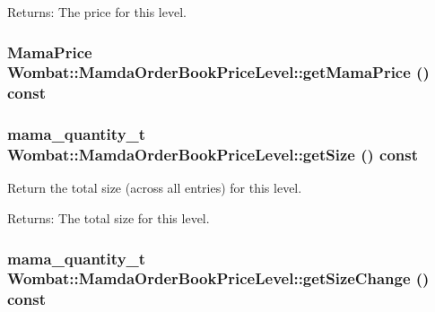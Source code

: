 \begin{Desc}
\item[Returns:]The price for this level. \end{Desc}
\hypertarget{classWombat_1_1MamdaOrderBookPriceLevel_f51f579cc10c5b537c4b9e07c9467ca0}{
\subsubsection[getMamaPrice]{\setlength{\rightskip}{0pt plus 5cm}Mama\-Price Wombat::Mamda\-Order\-Book\-Price\-Level::get\-Mama\-Price () const}}
\label{classWombat_1_1MamdaOrderBookPriceLevel_f51f579cc10c5b537c4b9e07c9467ca0}


\hypertarget{classWombat_1_1MamdaOrderBookPriceLevel_83c0889ecaab75f17606f933a4340dde}{
\subsubsection[getSize]{\setlength{\rightskip}{0pt plus 5cm}mama\_\-quantity\_\-t Wombat::Mamda\-Order\-Book\-Price\-Level::get\-Size () const}}
\label{classWombat_1_1MamdaOrderBookPriceLevel_83c0889ecaab75f17606f933a4340dde}


Return the total size (across all entries) for this level. 

\begin{Desc}
\item[Returns:]The total size for this level. \end{Desc}
\hypertarget{classWombat_1_1MamdaOrderBookPriceLevel_503caa5214b213027cdf972ad54a71f7}{
\subsubsection[getSizeChange]{\setlength{\rightskip}{0pt plus 5cm}mama\_\-quantity\_\-t Wombat::Mamda\-Order\-Book\-Price\-Level::get\-Size\-Change () const}}
\label{classWombat_1_1MamdaOrderBookPriceLevel_503caa5214b213027cdf972ad54a71f7}


